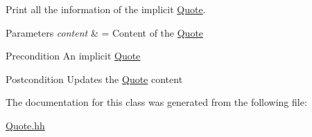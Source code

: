 Print all the information of the implicit \hyperlink{class_quote}{Quote}. 


\begin{DoxyParams}{Parameters}
{\em content} & = Content of the \hyperlink{class_quote}{Quote} \\
\hline
\end{DoxyParams}
\begin{DoxyPrecond}{Precondition}
An implicit \hyperlink{class_quote}{Quote} 
\end{DoxyPrecond}
\begin{DoxyPostcond}{Postcondition}
Updates the \hyperlink{class_quote}{Quote} content 
\end{DoxyPostcond}


The documentation for this class was generated from the following file\+:\begin{DoxyCompactItemize}
\item 
\hyperlink{_quote_8hh}{Quote.\+hh}\end{DoxyCompactItemize}
